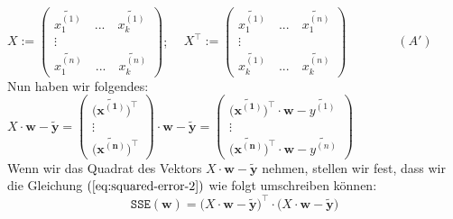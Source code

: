 \documentclass[12pt]{article}
\begin{document}
\\[0.3cm]
\hspace*{2.0cm}
$ X := \left(
  \begin{array}{c}
    \widetilde{x_1^{(1)}} \quad ... \quad  \widetilde{x_k^{(1)}}\\
    \vdots \\
    \widetilde{x_1^{(n)}} \quad ... \quad  \widetilde{x_k^{(n)}}
  \end{array}
  \right) 
$;       
$ \quad X^\top := \left(
  \begin{array}{c}
    \widetilde{x_1^{(1)}} \quad ... \quad  \widetilde{x_1^{(n)}}\\
    \vdots \\
    \widetilde{x_k^{(1)}} \quad ... \quad  \widetilde{x_k^{(n)}}
  \end{array}
  \right) \qquad \qquad (A') $
\\[0.2cm]
Nun haben wir folgendes:
\\[0.4
cm]
\hspace*{1.3cm}
$X \cdot \mathbf{w} - \mathbf{\widetilde{y} }= \left(
  \begin{array}{c}
    \bigl(\mathbf{\widetilde{x^{(1)}}}\bigr)^\top \\
    \vdots \\
    \bigl(\mathbf{\widetilde{x^{(n)}}}\bigr)^\top
  \end{array}
  \right) \cdot \mathbf{w} - \mathbf{\widetilde{y}} = \left(
  \begin{array}{c}
    \bigl(\mathbf{\widetilde{x^{(1)}}}\bigr)^\top \cdot \mathbf{w} - \widetilde{y^{(1)}} \\
    \vdots \\
    \bigl(\mathbf{\widetilde{x^{(n)}}}\bigr)^\top \cdot \mathbf{w} - \widetilde{y^{(n)}}
  \end{array}
  \right)
$
\\[0.2cm]
Wenn wir das Quadrat des Vektors $X \cdot \mathbf{w} - \mathbf{\widetilde{y}}$ nehmen, stellen wir fest, dass wir die Gleichung $\left(\ref{eq:squared-error-2} \right)$ wie folgt umschreiben können:\\[0.3cm]
\begin{equation}
  \label{eq:squared-error-5}
  \mathtt{SSE}(\mathbf{w}) = \bigl( X \cdot \mathbf{w} - 
  \mathbf{\widetilde{y}} \bigr)^\top \cdot \bigl( X \cdot 
  \mathbf{w} - \mathbf{\widetilde{y}}\bigr)
\end{equation}
%
\end{document}
